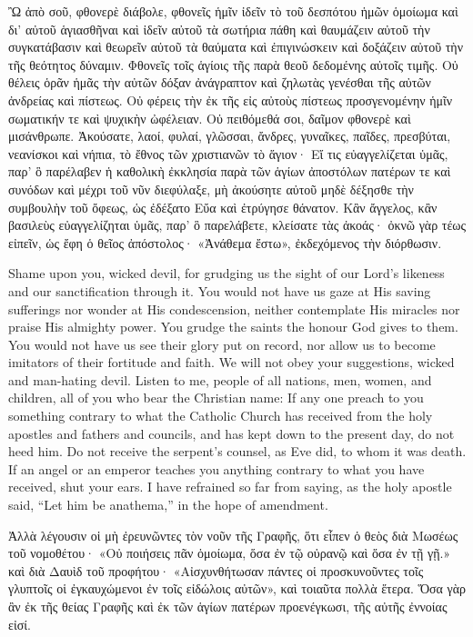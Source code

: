\documentclass[10pt]{book}
\newcommand{\switchgreek}[1][]{\selectlanguage{polutonikogreek} \switchcolumn*[#1]}
\newcommand{\switchenglish}{\selectlanguage{english} \switchcolumn}
\begin{document}
\begin{paracol}{2}
\switchgreek

Ὢ ἀπὸ σοῦ, φθονερὲ διάβολε, φθονεῖς ἡμῖν ἰδεῖν τὸ τοῦ δεσπότου ἡμῶν ὁμοίωμα
καὶ δι’ αὐτοῦ ἁγιασθῆναι καὶ ἰδεῖν αὐτοῦ τὰ σωτήρια πάθη καὶ θαυμάζειν αὐτοῦ
τὴν συγκατάβασιν καὶ θεωρεῖν αὐτοῦ τὰ θαύματα καὶ ἐπιγινώσκειν καὶ δοξάζειν
αὐτοῦ τὴν τῆς θεότητος δύναμιν. Φθονεῖς τοῖς ἁγίοις τῆς παρὰ θεοῦ δεδομένης
αὐτοῖς τιμῆς. Οὐ θέλεις ὁρᾶν ἡμᾶς τὴν αὐτῶν δόξαν ἀνάγραπτον καὶ ζηλωτὰς
γενέσθαι τῆς αὐτῶν ἀνδρείας καὶ πίστεως. Οὐ φέρεις τὴν ἐκ τῆς εἰς αὐτοὺς
πίστεως προσγενομένην ἡμῖν σωματικήν τε καὶ ψυχικὴν ὠφέλειαν. Οὐ πειθόμεθά
σοι, δαῖμον φθονερὲ καὶ μισάνθρωπε. Ἀκούσατε, λαοί, φυλαί, γλῶσσαι, ἄνδρες,
γυναῖκες, παῖδες, πρεσβύται, νεανίσκοι καὶ νήπια, τὸ ἔθνος τῶν χριστιανῶν τὸ
ἅγιον· Εἴ τις εὐαγγελίζεται ὑμᾶς, παρ’ ὃ παρέλαβεν ἡ καθολικὴ ἐκκλησία παρὰ
τῶν ἁγίων ἀποστόλων πατέρων τε καὶ συνόδων καὶ μέχρι τοῦ νῦν διεφύλαξε, μὴ
ἀκούσητε αὐτοῦ μηδὲ δέξησθε τὴν συμβουλὴν τοῦ ὄφεως, ὡς ἐδέξατο Εὔα καὶ
ἐτρύγησε θάνατον. Κἂν ἄγγελος, κἂν βασιλεὺς εὐαγγελίζηται ὑμᾶς, παρ’ ὃ
παρελάβετε, κλείσατε τὰς ἀκοάς· ὀκνῶ γὰρ τέως εἰπεῖν, ὡς ἔφη ὁ θεῖος
ἀπόστολος· «Ἀνάθεμα ἔστω», ἐκδεχόμενος τὴν διόρθωσιν.

\switchenglish

Shame upon you, wicked devil, for grudging 
us the sight of our Lord's likeness and our 
sanctification through it. You would not have 
us gaze at His saving sufferings nor wonder 
at His condescension, neither contemplate His 
miracles nor praise His almighty power. You 
grudge the saints the honour God gives to 
them. You would not have us see their glory 
put on record, nor allow us to become imitators 
of their fortitude and faith. We will not 
obey your suggestions, wicked and man-hating 
devil. Listen to me, people of all nations, 
men, women, and children, all of you who bear 
the Christian name: If any one preach to 
you something contrary to what the Catholic 
Church has received from the holy apostles 
and fathers and councils, and has kept down 
to the present day, do not heed him. Do not 
receive the serpent's counsel, as Eve did, to 
whom it was death. If an angel or an 
emperor teaches you anything contrary to 
what you have received, shut your ears. I 
have refrained so far from saying, as the holy 
apostle said, ``Let him be anathema,'' in the 
hope of amendment. 

\switchgreek

Ἀλλὰ λέγουσιν οἱ μὴ ἐρευνῶντες τὸν νοῦν τῆς Γραφῆς, ὅτι εἶπεν ὁ θεὸς διὰ
Μωσέως τοῦ νομοθέτου· «Οὐ ποιήσεις πᾶν ὁμοίωμα, ὅσα ἐν τῷ οὐρανῷ καὶ ὅσα ἐν
τῇ γῇ.» καὶ διὰ Δαυὶδ τοῦ προφήτου· «Αἰσχυνθήτωσαν πάντες οἱ προσκυνοῦντες
τοῖς γλυπτοῖς οἱ ἐγκαυχώμενοι ἐν τοῖς εἰδώλοις αὐτῶν», καὶ τοιαῦτα πολλὰ
ἕτερα. Ὅσα γὰρ ἂν ἐκ τῆς θείας Γραφῆς καὶ ἐκ τῶν ἁγίων πατέρων προενέγκωσι,
τῆς αὐτῆς ἐννοίας εἰσί.


\end{paracol}
\end{document}
